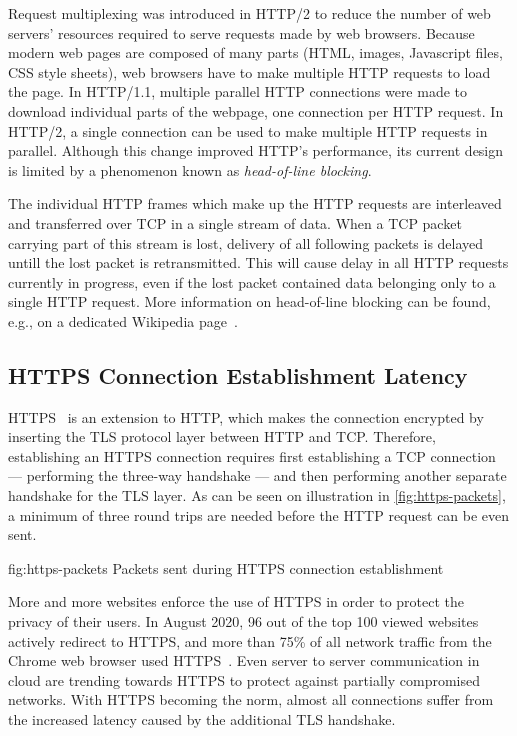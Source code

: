Request multiplexing was introduced in HTTP/2 to reduce the number of web servers' resources
required to serve requests made by web browsers. Because modern web pages are composed of many parts
(HTML, images, Javascript files, CSS style sheets), web browsers have to make multiple HTTP requests
to load the page. In HTTP/1.1, multiple parallel HTTP connections were made to download individual
parts of the webpage, one connection per HTTP request. In HTTP/2, a single connection can be used to
make multiple HTTP requests in parallel. Although this change improved HTTP's performance, its
current design is limited by a phenomenon known as \textit{head-of-line blocking}.

The individual HTTP frames which make up the HTTP requests are interleaved and transferred over TCP
in a single stream of data. When a TCP packet carrying part of this stream is lost, delivery of all
following packets is delayed untill the lost packet is retransmitted. This will cause delay in all
HTTP requests currently in progress, even if the lost packet contained data belonging only to a
single HTTP request. More information on head-of-line blocking can be found, e.g., on a dedicated
Wikipedia page~\cite{wiki:head-of-line-blocking}.

\subsection*{HTTPS Connection Establishment Latency}

HTTPS~\cite{rfc2818} is an extension to HTTP, which makes the connection encrypted by inserting the
TLS protocol layer between HTTP and TCP. Therefore, establishing an HTTPS connection requires first
establishing a TCP connection --- performing the three-way handshake --- and then performing another
separate handshake for the TLS layer. As can be seen on illustration in \autoref{fig:https-packets},
a minimum of three round trips are needed before the HTTP request can be even sent.

\begin{myFigure}
  {fig:https-packets}
  {Packets sent during HTTPS connection establishment}

  \resizebox{0.8\linewidth}{!}{}

\end{myFigure}

More and more websites enforce the use of HTTPS in order to protect the privacy of their users. In
August 2020, 96 out of the top 100 viewed websites actively redirect to HTTPS, and more than 75\% of
all network traffic from the Chrome web browser used HTTPS~\cite{googleTransparency}. Even server to
server communication in cloud are trending towards HTTPS to protect against partially compromised
networks. With HTTPS becoming the norm, almost all connections suffer from the increased latency
caused by the additional TLS handshake.


